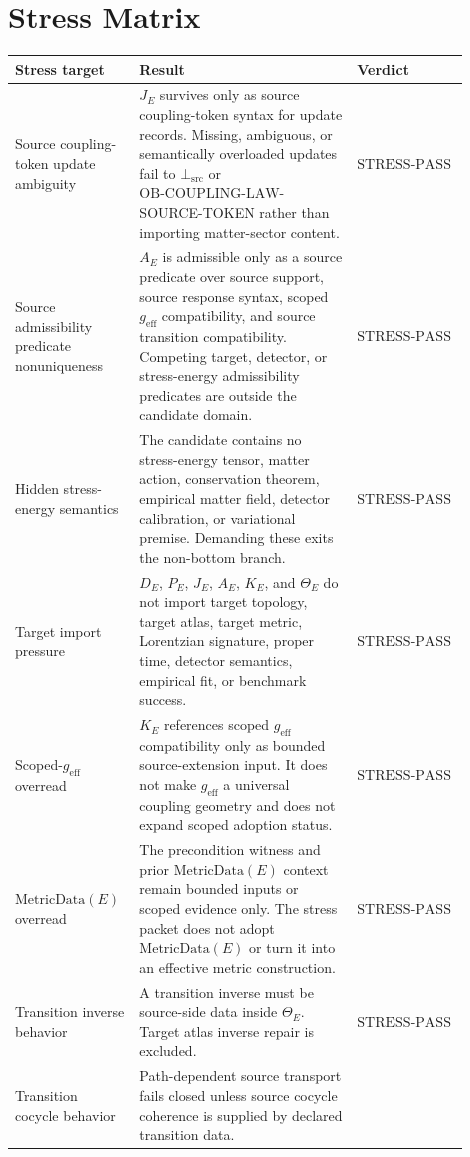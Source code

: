 \documentclass[11pt]{article}
\newcommand{\geff}{g_{\mathrm{eff}}}
\newcommand{\MetricData}{\mathrm{MetricData}}
\newcommand{\BottomSrc}{\bot_{\mathrm{src}}}
\newcommand{\OBCouplingLaw}{\mathrm{OB}\mbox{-}\mathrm{COUPLING}\mbox{-}\mathrm{LAW}}
\newcommand{\StressPass}{\mathrm{STRESS}\mbox{-}\mathrm{PASS}}
\begin{document}
\section{Stress Matrix}

\begin{longtable}{p{0.26\linewidth}p{0.46\linewidth}p{0.18\linewidth}}
\toprule
Stress target & Result & Verdict \\
\midrule
Source coupling-token update ambiguity & \(J_E\) survives only as source
coupling-token syntax for update records. Missing, ambiguous, or
semantically overloaded updates fail to \(\BottomSrc\) or
\(\OBCouplingLaw\)-SOURCE-TOKEN rather than importing matter-sector content.
& \(\StressPass\) \\
Source admissibility predicate nonuniqueness & \(A_E\) is admissible only as
a source predicate over source support, source response syntax, scoped
\(\geff\) compatibility, and source transition compatibility. Competing
target, detector, or stress-energy admissibility predicates are outside the
candidate domain. & \(\StressPass\) \\
Hidden stress-energy semantics & The candidate contains no stress-energy
tensor, matter action, conservation theorem, empirical matter field, detector
calibration, or variational premise. Demanding these exits the non-bottom
branch. & \(\StressPass\) \\
Target import pressure & \(D_E\), \(P_E\), \(J_E\), \(A_E\), \(K_E\), and
\(\Theta_E\) do not import target topology, target atlas, target metric,
Lorentzian signature, proper time, detector semantics, empirical fit, or
benchmark success. & \(\StressPass\) \\
Scoped-\(\geff\) overread & \(K_E\) references scoped \(\geff\)
compatibility only as bounded source-extension input. It does not make
\(\geff\) a universal coupling geometry and does not expand scoped adoption
status. & \(\StressPass\) \\
\(\MetricData(E)\) overread & The precondition witness and prior
\(\MetricData(E)\) context remain bounded inputs or scoped evidence only.
The stress packet does not adopt \(\MetricData(E)\) or turn it into an
effective metric construction. & \(\StressPass\) \\
Transition inverse behavior & A transition inverse must be source-side data
inside \(\Theta_E\). Target atlas inverse repair is excluded. &
\(\StressPass\) \\
Transition cocycle behavior & Path-dependent source transport fails closed
unless source cocycle coherence is supplied by declared transition data.

\end{longtable}
\end{document}
